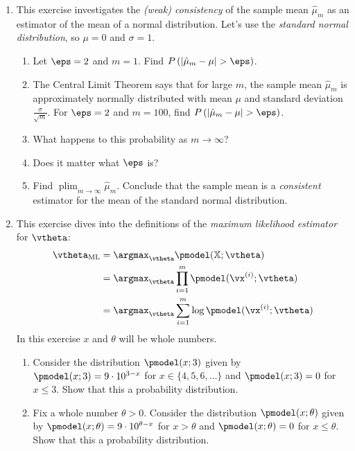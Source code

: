 \documentclass{article}
\DeclareMathOperator*{\plim}{plim}
\begin{document}
\begin{enumerate}
\begin{enumerate}
    \end{enumerate}
\item This exercise investigates the \emph{(weak) consistency} of the sample mean $\hat{\mu}_m$ as an estimator of the mean of a normal distribution. Let's use the \emph{standard normal distribution}, so $\mu = 0$ and $\sigma = 1$. 
    \begin{enumerate}
        \item Let $\eps = 2$ and $m = 1$. Find $P\left(\lvert \hat{\mu}_m - \mu \rvert > \eps \right)$. 
        \item The Central Limit Theorem says that for large $m$, the sample mean $\hat{\mu}_m$ is approximately normally distributed with mean $\mu$ and standard deviation $\frac{\sigma}{\sqrt{m}}$. For $\eps = 2$ and $m = 100$, find $P\left(\lvert \hat{\mu}_m - \mu \rvert > \eps \right)$.
        \item What happens to this probability as $m \to \infty$? \item Does it matter what $\eps$ is?
        \item Find $\plim_{m\to\infty} \hat{\mu}_m$. Conclude that the sample mean is a \emph{consistent} estimator for the mean of the standard normal distribution. 
    \end{enumerate}
\item This exercise dives into the definitions of the \emph{maximum likelihood estimator} for $\vtheta$:
    \begin{align}
    \vtheta_\textnormal{ML} & = \argmax_\vtheta \pmodel(\mathbb{X}; \vtheta)                  \nonumber    \\
                           & = \argmax_\vtheta \prod_{i = 1}^m \pmodel(\vx^{(i)}; \vtheta)   \label{TMLdef1} \\
                           & = \argmax_\vtheta \sum_{i = 1}^m \log \pmodel(\vx^{(i)}; \vtheta)   \label{TMLdef2}
    \end{align}
    In this exercise $x$ and $\theta$ will be whole numbers.
    \begin{enumerate}
        \item Consider the distribution $\pmodel(x;3)$ given by $\pmodel(x;3) = 9\cdot10^{3-x}$ for $x \in \{4, 5, 6, \ldots\}$ and $\pmodel(x; 3) = 0$ for $x \leq 3$. Show that this a probability distribution.
        \item Fix a whole number $\theta > 0$. Consider the distribution $\pmodel(x;\theta)$ given by $\pmodel(x;\theta) = 9\cdot10^{\theta-x}$ for $x > \theta$ and $\pmodel(x; \theta) = 0$ for $x \leq \theta$. Show that this a probability distribution.

\end{enumerate}
\end{enumerate}
\end{document}
